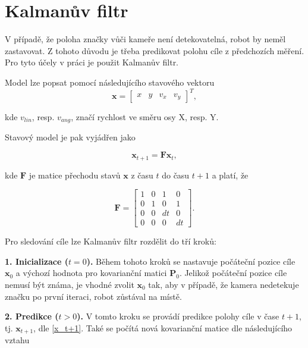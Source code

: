 \documentclass[twoside]{ctuthesis}
\theoremstyle{plain}
\theoremstyle{definition}
\theoremstyle{note}
\begin{document}
\section{Kalmanův filtr}
\label{kalman_section}
V případě, že poloha značky vůči kameře není detekovatelná, robot by neměl zastavovat. Z tohoto důvodu je třeba predikovat polohu cíle z předchozích měření. Pro tyto účely v práci je použit Kalmanův filtr. 

Model lze popsat pomocí následujícího stavového vektoru
\begin{equation}
{\boldsymbol{x}} = 
\begin{bmatrix}
x&y&v_{x}&v_{y}
\end{bmatrix}^T,
\end{equation}

kde $v_{lin}$, resp. $v_{ang}$, značí rychlost ve směru osy X, resp. Y.


Stavový model je pak vyjádřen jako

\begin{equation}
\label{x_t+1}
{\boldsymbol{x}}_{t+1} = \boldsymbol{F}{\boldsymbol{x}}_{t},
\end{equation}

kde $\boldsymbol{F}$ je matice přechodu stavů $\boldsymbol{x}$ z času $t$ do času $t + 1$ a platí, že

\begin{equation}
\boldsymbol{F} = \begin{bmatrix}
1&0&1&0\\
0&1&0&1\\
0&0&dt&0\\
0&0&0&dt
\end{bmatrix}.
\end{equation}

Pro sledování cíle lze Kalmanův filtr rozdělit do tří kroků:

\textbf{1.  Inicializace ($t = 0$).} Během tohoto kroků se nastavuje počáteční pozice cíle $\boldsymbol{x}_0$ a výchozí hodnota pro kovarianční matici $\boldsymbol{P}_0$. Jelikož počáteční pozice cíle nemusí být známa, je vhodné zvolit $\boldsymbol{x}_0$ tak, aby v případě, že kamera nedetekuje značku po první iteraci, robot zůstával na místě.

\textbf{2. Predikce ($t > 0$).} V tomto kroku se provádí predikce polohy cíle v čase $t + 1$, tj. $\boldsymbol{x}_{t+1}$, dle \ref{x_t+1}. Také se počítá nová kovarianční matice dle následujícího vztahu
\end{document}
